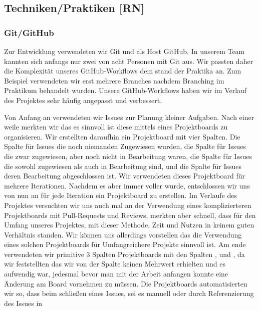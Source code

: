 \documentclass[10pt]{article}
\begin{document}
\subsection{Techniken/Praktiken [RN]}
\subsubsection{Git/GitHub}
Zur Entwicklung verwendeten wir Git und als Host GitHub. In unserem Team kannten sich anfangs nur zwei von acht Personen
mit Git aus. Wir passten daher die Komplexität unseres GitHub-Workflows dem stand der Praktika an. Zum Beispiel 
verwendeten wir erst mehrere Branches nachdem Branching im Praktikum behandelt wurden. Unsere GitHub-Workflows haben
wir im Verlauf des Projektes sehr häufig angepasst und verbessert.\par
\medskip
Von Anfang an verwendeten wir Issues zur Planung kleiner Aufgaben. Nach einer weile merkten wir das es sinnvoll
ist diese mittels eines Projektboards zu organisieren. Wir erstellten daraufhin ein Projektboard mit vier Spalten.
Die Spalte  für Issues die noch niemanden Zugewiesen wurden, die Spalte  für Issues die 
zwar zugewiesen, aber noch nicht in Bearbeitung waren, die Spalte  für Issues die sowohl zugewiesen 
als auch in Bearbeitung sind, und die Spalte  für Issues deren Bearbeitung abgeschlossen ist.
Wir verwendeten dieses Projektboard für mehrere Iterationen. Nachdem es aber immer voller wurde, entschlossen wir uns 
von nun an für jede Iteration ein Projektboard zu erstellen. Im Verlaufe des Projektes versuchten wir uns auch mal 
an der Verwendung eines komplizierteren Projektboards mit Pull-Requests und Reviews, merkten aber schnell, dass 
für den Umfang unseres Projektes, mit dieser Methode, Zeit und Nutzen in keinem guten Verhältnis standen.
Wir können uns allerdings vorstellen das die Verwendung eines solchen Projektboards für Umfangreichere Projekte 
sinnvoll ist. Am ende verwendeten wir primitive 3 Spalten Projektboards mit den Spalten ,  und
, da wir feststellten das wir von der Spalte  keinen Mehrwert erhielten und es aufwendig 
war, jedesmal bevor man mit der Arbeit anfangen konnte eine Änderung am Board vornehmen zu müssen. Die Projektboards 
automatisierten wir so, dass beim schließen eines Issues, sei es manuell oder durch Referenzierung des Issues in 
\end{document}
